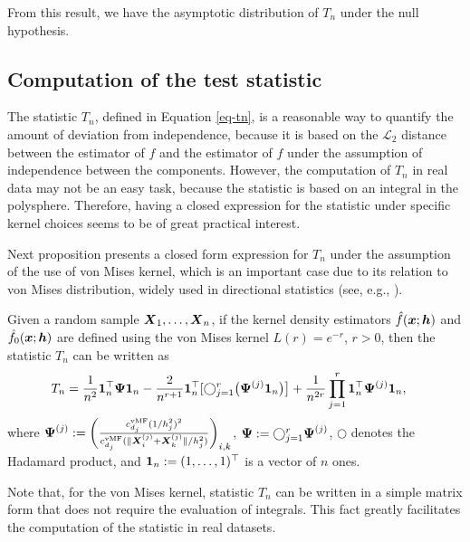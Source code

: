 \documentclass[oneside,11pt]{article}
\begin{document}
From this result, we have the asymptotic distribution of $T_n$ under the null hypothesis.

\subsection{Computation of the test statistic}

The statistic $T_n$, defined in Equation \eqref{eq-tn}, is a reasonable way to quantify the amount of deviation from independence, because it is based on the $\mathcal{L}_2$ distance between the estimator of $f$ and the estimator of $f$ under the assumption of independence between the components. However, the computation of $T_n$ in real data may not be an easy task, because the statistic is based on an integral in the polysphere. Therefore, having a closed expression for the statistic under specific kernel choices seems to be of great practical interest.

Next proposition presents a closed form expression for $T_n$ under the assumption of the use of von Mises kernel, which is an important case due to its relation to von Mises distribution, widely used in directional statistics (see, e.g., \cite{Garcia-Portugues2014}).

\begin{proposition} \label{prp:exactstat}
     Given a random sample $\boldsymbol{X}_1, \dots, \boldsymbol{X}_n$, if the kernel density estimators $\hat{f}(\boldsymbol{x};{\boldsymbol{h}})$ and $\hat{f}_{0}(\boldsymbol{x};{\boldsymbol{h}})$ are defined using the von Mises kernel $L(r) = e^{-r}$, $r>0$, then the statistic $T_n$ can be written as
    \begin{align*}
        T_n &= \frac{1}{n^2} \boldsymbol{1}_n^{\top} \boldsymbol{\Psi} \boldsymbol{1}_n - \frac{2}{n^{r+1}} \boldsymbol{1}_n^\top[\bigcirc_{j=1}^{r}\big(\boldsymbol{\Psi}^{(j)} \boldsymbol{1}_n\big)\big] + \frac{1}{n^{2r}} \prod_{j=1}^{r} \boldsymbol{1}_n^{\top} \boldsymbol{\Psi}^{(j)} \boldsymbol{1}_n,
    \end{align*}
    where $\boldsymbol{\Psi}^{(j)} := \bigg( \frac{c_{d_j}^\mathrm{vMF}(1/h_j^2)^2}{c_{d_j}^\mathrm{vMF}(\|\boldsymbol{X}_i^{(j)} + \boldsymbol{X}_k^{(j)}\|/h_j^2)} \bigg)_{i,k}$, $\boldsymbol{\Psi} := \bigcirc_{j=1}^{r} \boldsymbol{\Psi}^{(j)}$, $\bigcirc$ denotes the Hadamard product, and $\boldsymbol{1}_n := (1,\dots,1)^{\top}$ is a vector of $n$ ones.
\end{proposition}

Note that, for the von Mises kernel, statistic $T_n$ can be written in a simple matrix form that does not require the evaluation of integrals. This fact greatly facilitates the computation of the statistic in real datasets.
\end{document}
